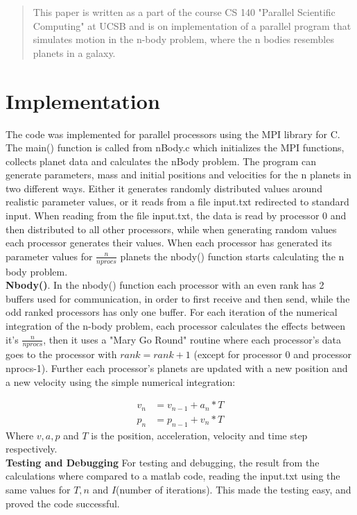 \begin{abstract}
This paper is written as a part of the course CS 140 "Parallel Scientific Computing" at UCSB and is on implementation of a parallel program that simulates motion in the n-body problem, where the n bodies resembles planets in a galaxy.
\end{abstract}

\section{Implementation}
The code was implemented for parallel processors using the MPI library for C. The main() function is called from nBody.c which initializes the MPI functions, collects planet data and calculates the nBody problem. The program can generate parameters, mass and initial positions and velocities for the n planets in two different ways. Either it generates randomly distributed values around realistic parameter values, or it reads from a file input.txt redirected to standard input. When reading from the file input.txt, the data is read by processor 0 and then distributed to all other processors, while when generating random values each processor generates their values. When each processor has generated its parameter values for $\frac{n}{nprocs}$ planets the nbody() function starts calculating the n body problem. \\
\textbf{Nbody()}. In the nbody() function each processor with an even rank has 2 buffers used for communication, in order to first receive and then send, while the odd ranked processors has only one buffer. For each iteration of the numerical integration of the n-body problem, each processor calculates the effects between it's $\frac{n}{nprocs}$, then it uses a "Mary Go Round" routine where each processor's data goes to the processor with $rank=rank+1$ (except for processor 0 and processor nprocs-1). Further each processor's planets are updated with a new position and a new velocity using the simple numerical integration:

\begin{align}
\label{eq:}
 v_n&=v_{n-1}+a_n*T \\
p_n&=p_{n-1}+v_n*T
 \end{align}
Where $v, a, p$ and $T$ is the position, acceleration, velocity and time step respectively. \\




\textbf{Testing and Debugging}
For testing and debugging, the result from the calculations where compared to a matlab code, reading the input.txt using the same values for $T,n$ and $I$(number of iterations). This made
the testing easy, and proved the code successful. 

